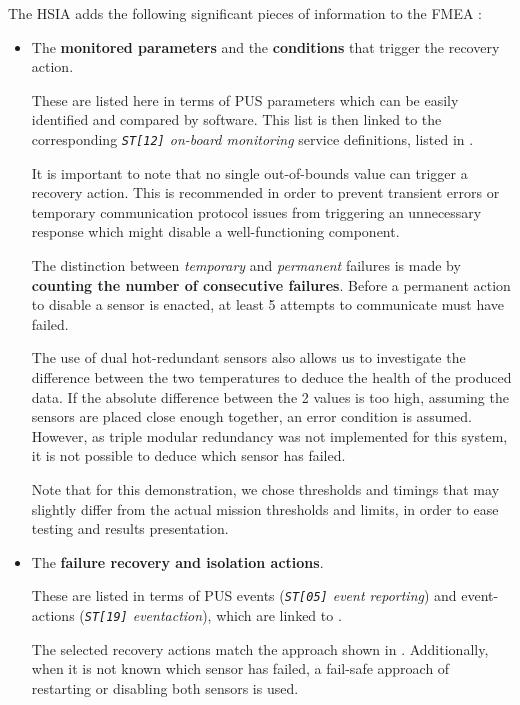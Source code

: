 \documentclass[a4paper,nobib,final]{tufte-book}
\begin{document}
The \ac{HSIA} adds the following significant pieces of information to the \ac{FMEA} \autocite{ECSS-Q-ST-30-02C}:
\begin{itemize}
	\item The \textbf{monitored parameters} and the \textbf{conditions} that trigger the recovery action.
	
	These are listed here in terms of \ac{PUS} parameters which can be easily identified and compared by software. This list is then linked to the corresponding \emph{\texttt{ST[12]} on-board monitoring} service definitions, listed in .
	
	It is important to note that no single out-of-bounds value can trigger a recovery action. This is recommended in order to prevent transient errors or temporary communication protocol issues from triggering an unnecessary response which might disable a well-functioning component.
	
	The distinction between \emph{temporary} and \emph{permanent} failures is made by \textbf{counting the number of consecutive failures}. Before a permanent action to disable a sensor is enacted, at least 5 attempts to communicate must have failed.
	
	The use of dual hot-redundant sensors also allows us to investigate the difference between the two temperatures to deduce the health of the produced data. If the absolute difference between the 2 values is too high, assuming the sensors are placed close enough together, an error condition is assumed. However, as triple modular redundancy was not implemented for this system, it is not possible to deduce which sensor has failed.
	
	Note that for this demonstration, we chose thresholds and timings that may slightly differ from the actual mission thresholds and limits, in order to ease testing and results presentation.
	
	\item The \textbf{failure recovery and isolation actions}.
	
	These are listed in terms of \ac{PUS} events (\emph{\texttt{ST[05]} event reporting}) and event-actions (\emph{\texttt{ST[19]} eventaction}), which are linked to .
	
	The selected recovery actions match the approach shown in . Additionally, when it is not known which sensor has failed, a fail-safe approach of restarting or disabling both sensors is used.
\end{itemize}
\end{document}
